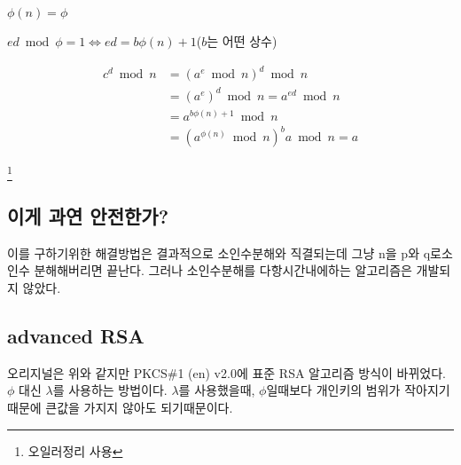 $ \phi(n) = \phi$

$ ed\bmod \phi =1 \Longleftrightarrow ed = b\phi(n)+1$($b$는 어떤 상수)

\begin{align*}
  c^d \bmod n &=(a^e \bmod n)^d \bmod n \\ 
  &=(a^e)^d \bmod n = a^{ed} \bmod n \\
  &=  a^{b\phi(n)+1}\bmod n  \\
  &= (a^{\phi(n)} \bmod n)^{b} a \bmod n =a  
\end{align*}

\footnote{오일러정리 사용}

\subsection{이게 과연 안전한가?}


이를 구하기위한 해결방법은 결과적으로 소인수분해와 직결되는데 그냥 n을 p와 q로소인수 분해해버리면 끝난다. 그러나 소인수분해를 다항시간내에하는 알고리즘은 개발되지 않았다.



\subsection{advanced RSA}


오리지널은 위와 같지만  PKCS$\#$1 (en) v2.0에 표준 RSA 알고리즘 방식이 바뀌었다.
$\phi$ 대신 $\lambda$를 사용하는 방법이다. $\lambda$를 사용했을때, $\phi$일때보다 개인키의 범위가 작아지기 때문에 큰값을 가지지 않아도 되기때문이다.

